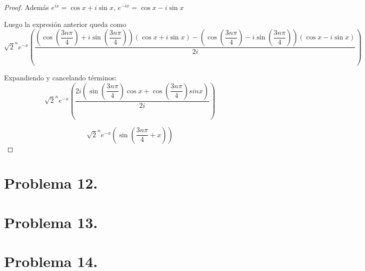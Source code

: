 \documentclass[11pt]{article}
\theoremstyle{Tema} \newtheorem{Tema}{Tema} %
\theoremstyle{Tema} \newtheorem{serie}{Serie}              %
\theoremstyle{Tema} \newtheorem{ejercicio}{Ejercicio}    %
\begin{document}
\begin{proof}
Adem\'as $ e^{ix}=\cos x+i\sin x $, 	$ e^{-ix}=\cos x-i\sin x $		
			
Luego la expresi\'on anterior queda como			
	\begin{equation*}
	\sqrt{2}^ne^{-x}\left(\dfrac{\left(\cos\left(\dfrac{3n\pi}{4}\right)+i\sin\left(\dfrac{3n\pi}{4}\right)\right)(\cos x+i\sin x)-\left(\cos\left(\dfrac{3n\pi}{4}\right)-i\sin\left(\dfrac{3n\pi}{4}\right)\right)(\cos x-i\sin x)}{2i}\right)
	\end{equation*}		
			
Expandiendo y cancelando t\'erminos:
	\begin{equation*}
	\sqrt{2}^ne^{-x}\left(\dfrac{2i\left(\sin\left(\dfrac{3n\pi}{4}\right)\cos x+\cos\left(\dfrac{3n\pi}{4}\right)sin x\right)}{2i}\right)
	\end{equation*}	
	
		\begin{equation*}
	\sqrt{2}^ne^{-x}\left(\sin\left(\dfrac{3n\pi}{4}+x\right)\right)
		\end{equation*}		
		
		
			
		\end{proof}
	
\section*{\textbf{Problema 12.} }
 

\section*{\textbf{Problema 13.} }


\section*{\textbf{Problema 14.} }
\end{document}
